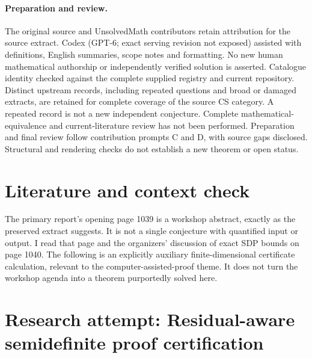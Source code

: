 \documentclass[11pt]{article}
\begin{document}
\paragraph{Preparation and review.}
The original source and UnsolvedMath contributors retain attribution for the source extract. Codex (GPT-6; exact serving revision not exposed) assisted with definitions, English summaries, scope notes and formatting. No new human mathematical authorship or independently verified solution is asserted. Catalogue identity checked against the complete supplied registry and current repository. Distinct upstream records, including repeated questions and broad or damaged extracts, are retained for complete coverage of the source CS category. A repeated record is not a new independent conjecture. Complete mathematical-equivalence and current-literature review has not been performed. Preparation and final review follow contribution prompts C and D, with source gaps disclosed. Structural and rendering checks do not establish a new theorem or open status.
\label{end:statement}

\section{Literature and context check}

The primary report's opening page 1039 is a workshop abstract, exactly as the
preserved extract suggests. It is not a single conjecture with quantified input
or output. I read that page and the organizers' discussion of exact SDP bounds
on page 1040. The following is an explicitly auxiliary finite-dimensional
certificate calculation, relevant to the computer-assisted-proof theme. It does
not turn the workshop agenda into a theorem purportedly solved here.

\section{Research attempt: Residual-aware semidefinite proof certification}
\end{document}
